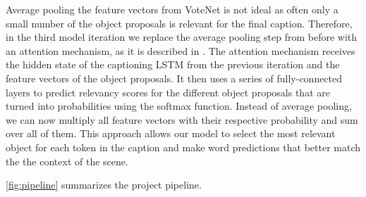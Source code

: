 \documentclass[10pt,twocolumn,letterpaper]{article}
\begin{document}
Average pooling the feature vectors from VoteNet is not ideal as often only a small number of the object proposals is relevant for the final caption. Therefore, in the third model iteration we replace the average pooling step from before with an attention mechanism, as it is described in \cite{xu2015show}. The attention mechanism receives the hidden state of the captioning LSTM from the previous iteration and the feature vectors of the object proposals. It then uses a series of fully-connected layers to predict relevancy scores for the different object proposals that are turned into probabilities using the softmax function. Instead of average pooling, we can now multiply all feature vectors with their respective probability and sum over all of them. This approach allows our model to select the most relevant object for each token in the caption and make word predictions that better match the the context of the scene.

\autoref{fig:pipeline} summarizes the project pipeline.

\end{document}
